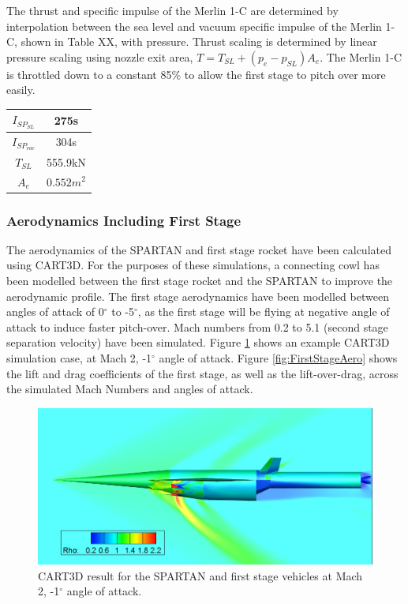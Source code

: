 The thrust and specific impulse of the Merlin 1-C are determined by interpolation between the sea level and vacuum specific impulse of the Merlin 1-C, shown in Table XX, with pressure. Thrust scaling is determined by linear pressure scaling using nozzle exit area, $T = T_{SL} + (p_e - p_{SL})A_e$. 
 The Merlin 1-C is throttled down to a constant 85\% to allow the first stage to pitch over more easily.

\begin{tabular}{|c|c|}
	\hline  $I_{SP_{SL}}$ & 275s \\ 
	\hline  $I_{SP_{vac}}$ & 304s\\ 
	\hline  $T_{SL}$ & 555.9kN \\ 
	\hline  $A_{e}$ & $0.552m^2$ \\ 
	\hline 
\end{tabular} 

  \subsubsection{Aerodynamics Including First Stage}

  
  The aerodynamics of the SPARTAN and first stage rocket have been calculated using CART3D. For the purposes of these simulations, a connecting cowl has been modelled between the first stage rocket and the SPARTAN to improve the aerodynamic profile. The first stage aerodynamics have been modelled between angles of attack of 0$^\circ$ to -5$^\circ$, as the first stage will be flying at negative angle of attack to induce faster pitch-over. Mach numbers from 0.2 to 5.1 (second stage separation velocity) have been simulated. Figure \ref{fig:CARTcontour} shows an example CART3D simulation case, at Mach 2, -1$^\circ$ angle of attack. Figure \ref{fig:FirstStageAero} shows the lift and drag coefficients of the first stage, as well as the lift-over-drag, across the simulated Mach Numbers and angles of attack. 
  
  
  
  \begin{figure}
  	\centering
  	\includegraphics[width=0.7\linewidth]{figures/3_vehicle_design/CARTcontour}
  	\caption{CART3D result for the SPARTAN and first stage vehicles at Mach 2, -1$^\circ$ angle of attack.}
  	\label{fig:CARTcontour}
  \end{figure}

